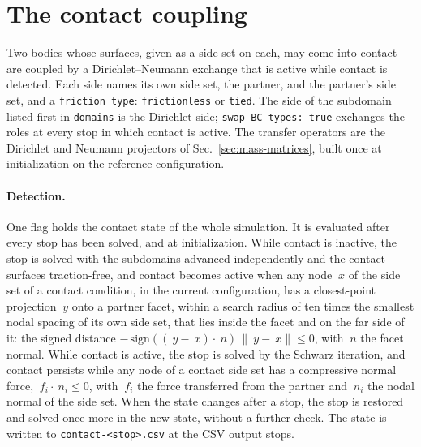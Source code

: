 \documentclass[11pt]{article}
\newcommand{\norm}[1]{\lVert #1 \rVert}
\newcommand{\code}[1]{\texttt{#1}}
\begin{document}
\section{The contact coupling}
\label{sec:contact}

Two bodies whose surfaces, given as a side set on each, may come into
contact are coupled by a Dirichlet--Neumann exchange that is active while
contact is detected. Each side names its own side set, the partner, and
the partner's side set, and a \code{friction type}: \code{frictionless}
or \code{tied}. The side of the subdomain listed first in \code{domains}
is the Dirichlet side; \code{swap BC types: true} exchanges the roles at
every stop in which contact is active. The transfer operators are the
Dirichlet and Neumann projectors of Sec.~\ref{sec:mass-matrices}, built
once at initialization on the reference configuration.

\paragraph{Detection.} One flag holds the contact state of the whole
simulation. It is evaluated after every stop has been solved, and at
initialization. While contact is inactive, the stop is solved with the
subdomains advanced independently and the contact surfaces traction-free,
and contact becomes active when any node $~x$ of the side set of a
contact condition, in the current configuration, has a closest-point
projection $~y$ onto a partner facet, within a search radius of ten times
the smallest nodal spacing of its own side set, that lies inside the facet
and on the far side of it: the signed distance
$-\,\mathrm{sign}((~y - ~x) \cdot ~n)\, \norm{~y - ~x} \le 0$, with $~n$ the
facet normal. While contact is active, the stop is solved by the Schwarz
iteration, and contact persists while any node of a contact side set has
a compressive normal force, $~f_i \cdot ~n_i \le 0$, with $~f_i$ the force
transferred from the partner and $~n_i$ the nodal normal of the side set.
When the state changes after a stop, the stop is restored and solved once
more in the new state, without a further check. The state is written to
\code{contact-<stop>.csv} at the CSV output stops.
\end{document}
